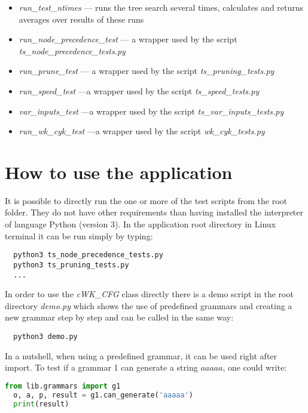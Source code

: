 \begin{itemize}
  \item{\textit{run\_test\_ntimes} --- runs the tree search several times, calculates and returns averages over results of these runs}
  \item{\textit{run\_node\_precedence\_test} --- a wrapper used by the script \textit{ts\_node\_precedence\_tests.py}}
  \item{\textit{run\_prune\_test} --- a wrapper used by the script \textit{ts\_pruning\_tests.py}}
  \item{\textit{run\_speed\_test} ---a wrapper used by the script \textit{ts\_speed\_tests.py}}
  \item{\textit{var\_inputs\_test} ---a wrapper used by the script \textit{ts\_var\_inputs\_tests.py}}
  \item{\textit{run\_wk\_cyk\_test} ---a wrapper used by the script \textit{wk\_cyk\_tests.py}}
\end{itemize}


\section{How to use the application}
It is possible to directly run the one or more of the test scripts from the root folder. They do not have other requirements than having installed the interpreter of language Python (version 3). In the application root directory in Linux terminal it can be run simply by typing:

\begin{verbatim}
  python3 ts_node_precedence_tests.py
  python3 ts_pruning_tests.py
  ...
\end{verbatim}

In order to use the \textit{cWK\_CFG} class directly there is a demo script in the root directory \textit{demo.py} which shows the use of predefined grammars and creating a new grammar step by step and can be called in the same way:

\begin{verbatim}
  python3 demo.py
\end{verbatim}

In a nutshell, when using a predefined grammar, it can be used right after import. To test if a grammar 1 can generate a string $aaaaa$, one could write:
\begin{lstlisting}[language=Python]
  from lib.grammars import g1
  o, a, p, result = g1.can_generate('aaaaa')
  print(result)
\end{lstlisting}

